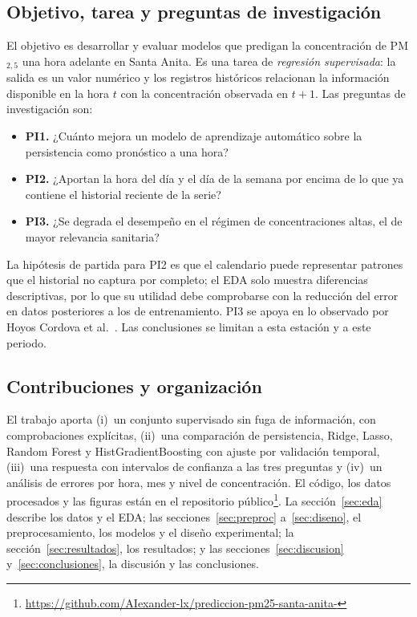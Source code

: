 \subsection{Objetivo, tarea y preguntas de investigación}
El objetivo es desarrollar y evaluar modelos que predigan la concentración de PM$_{2{,}5}$ una hora adelante en Santa Anita. Es una tarea de \emph{regresión supervisada}: la salida es un valor numérico y los registros históricos relacionan la información disponible en la hora $t$ con la concentración observada en $t+1$. Las preguntas de investigación son:
\begin{itemize}
\item \textbf{PI1.} ¿Cuánto mejora un modelo de aprendizaje automático sobre la persistencia como pronóstico a una hora?
\item \textbf{PI2.} ¿Aportan la hora del día y el día de la semana por encima de lo que ya contiene el historial reciente de la serie?
\item \textbf{PI3.} ¿Se degrada el desempeño en el régimen de concentraciones altas, el de mayor relevancia sanitaria?
\end{itemize}
La hipótesis de partida para PI2 es que el calendario puede representar patrones que el historial no captura por completo; el EDA solo muestra diferencias descriptivas, por lo que su utilidad debe comprobarse con la reducción del error en datos posteriores a los de entrenamiento. PI3 se apoya en lo observado por Hoyos Cordova et al.~\cite{hoyos2021}. Las conclusiones se limitan a esta estación y a este periodo.

\subsection{Contribuciones y organización}
El trabajo aporta (i)~un conjunto supervisado sin fuga de información, con comprobaciones explícitas, (ii)~una comparación de persistencia, Ridge, Lasso, Random Forest y HistGradientBoosting con ajuste por validación temporal, (iii)~una respuesta con intervalos de confianza a las tres preguntas y (iv)~un análisis de errores por hora, mes y nivel de concentración. El código, los datos procesados y las figuras están en el repositorio público\footnote{\url{https://github.com/AIexander-lx/prediccion-pm25-santa-anita-}}. La sección~\ref{sec:eda} describe los datos y el EDA; las secciones~\ref{sec:preproc} a~\ref{sec:diseno}, el preprocesamiento, los modelos y el diseño experimental; la sección~\ref{sec:resultados}, los resultados; y las secciones~\ref{sec:discusion} y~\ref{sec:conclusiones}, la discusión y las conclusiones.
